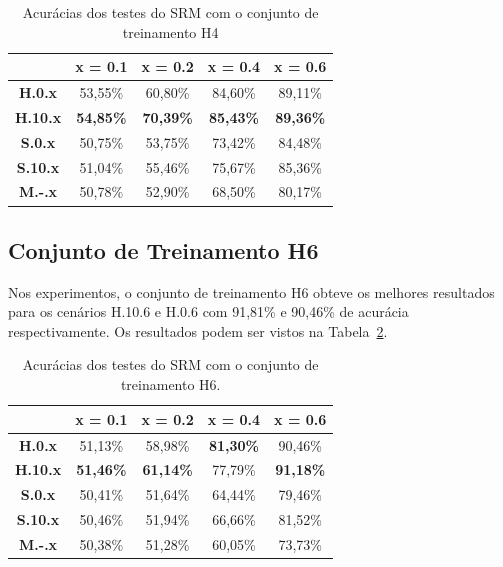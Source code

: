 \begin{table}[!htb]
\centering
\begin{tabular}{c|c|c|c|c|}
\cline{2-5}
\textbf{}                             & \textbf{x = 0.1} & \textbf{x = 0.2} & \textbf{x = 0.4} & \textbf{x = 0.6} \\ \hline
\multicolumn{1}{|c|}{\textbf{H.0.x}}  & 53,55\%          & 60,80\%          & 84,60\%          & 89,11\%          \\ \hline
\multicolumn{1}{|c|}{\textbf{H.10.x}} & \textbf{54,85\%} & \textbf{70,39\%} & \textbf{85,43\%} & \textbf{89,36\%} \\ \hline
\multicolumn{1}{|c|}{\textbf{S.0.x}}  & 50,75\%          & 53,75\%          & 73,42\%          & 84,48\%          \\ \hline
\multicolumn{1}{|c|}{\textbf{S.10.x}} & 51,04\%          & 55,46\%         & 75,67\%          & 85,36\%          \\ \hline
\multicolumn{1}{|c|}{\textbf{M.-.x}}  & 50,78\%          & 52,90\%          & 68,50\%          & 80,17\%          \\ \hline
\end{tabular}
\caption{Acurácias dos testes do SRM com o conjunto de treinamento H4}
\label{tab:srm_h4}
\end{table}


\subsection{Conjunto de Treinamento H6}

Nos experimentos, o conjunto de treinamento H6 obteve os melhores resultados para os cenários H.10.6 e H.0.6 com 91,81\% e 90,46\% de acurácia respectivamente. Os resultados podem ser vistos na Tabela~\ref{tab:srm_h6}.

\begin{table}[!htb]
\centering
\begin{tabular}{c|c|c|c|c|}
\cline{2-5}
\textbf{}                             & \textbf{x = 0.1} & \textbf{x = 0.2} & \textbf{x = 0.4} & \textbf{x = 0.6} \\ \hline
\multicolumn{1}{|c|}{\textbf{H.0.x}}  & 51,13\%          & 58,98\%          & \textbf{81,30\%}          & 90,46\%          \\ \hline
\multicolumn{1}{|c|}{\textbf{H.10.x}} & \textbf{51,46\%} & \textbf{61,14\%} & 77,79\% & \textbf{91,18\%} \\ \hline
\multicolumn{1}{|c|}{\textbf{S.0.x}}  & 50,41\%          & 51,64\%          & 64,44\%          & 79,46\%          \\ \hline
\multicolumn{1}{|c|}{\textbf{S.10.x}} & 50,46\%          & 51,94\%         & 66,66\%          & 81,52\%          \\ \hline
\multicolumn{1}{|c|}{\textbf{M.-.x}}  & 50,38\%          & 51,28\%          & 60,05\%          & 73,73\%          \\ \hline
\end{tabular}
\caption{Acurácias dos testes do SRM com o conjunto de treinamento H6.}
\label{tab:srm_h6}
\end{table}


